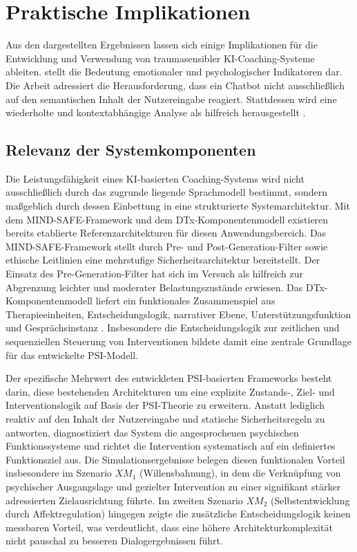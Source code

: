 \section{Praktische Implikationen}
Aus den dargestellten Ergebnissen lassen sich einige Implikationen für die Entwicklung und Verwendung von traumasensibler KI-Coaching-Systeme ableiten. \cite{Kuhl2000The} stellt die Bedeutung emotionaler und psychologischer Indikatoren dar. Die Arbeit adressiert die Herausforderung, dass ein Chatbot nicht ausschließlich auf den semantischen Inhalt der Nutzereingabe reagiert. Stattdessen wird eine wiederholte und kontextabhängige Analyse als hilfreich herausgestellt \citep{kuhl2014psi,mai2020ai}. 

\subsection{Relevanz der Systemkomponenten}

Die Leistungsfähigkeit eines KI-basierten Coaching-Systems wird nicht ausschließlich 
durch das zugrunde liegende Sprachmodell bestimmt, sondern maßgeblich durch dessen 
Einbettung in eine strukturierte Systemarchitektur. Mit dem MIND-SAFE-Framework 
\citep{boit2025prompt} und dem DTx-Komponentenmodell \citep{baumel2025more} existieren 
bereits etablierte Referenzarchitekturen für diesen Anwendungsbereich. Das 
MIND-SAFE-Framework stellt durch Pre- und Post-Generation-Filter sowie ethische Leitlinien eine 
mehrstufige Sicherheitsarchitektur bereitstellt. Der Einsatz des Pre-Generation-Filter hat sich im Versuch als hilfreich zur 
Abgrenzung leichter und moderater Belastungszustände erwiesen. Das 
DTx-Komponentenmodell liefert ein funktionales Zusammenspiel aus 
Therapieeinheiten, Entscheidungslogik, narrativer Ebene, Unterstützungsfunktion 
und Gesprächsinstanz \citep{baumel2025more}. Insbesondere die Entscheidungslogik zur 
zeitlichen und sequenziellen Steuerung von Interventionen bildete damit eine zentrale 
Grundlage für das entwickelte PSI-Modell.

Der spezifische Mehrwert des entwickleten PSI-basierten Frameworks besteht darin, diese bestehenden 
Architekturen um eine explizite Zustands-, Ziel- und Interventionslogik auf Basis der 
PSI-Theorie zu erweitern. Anstatt lediglich reaktiv auf den Inhalt der Nutzereingabe 
und statische Sicherheitsregeln zu antworten, diagnostiziert das System die 
angesprochenen psychischen Funktionssysteme und richtet die Intervention systematisch 
auf ein definiertes Funktionsziel aus. Die Simulationsergebnisse belegen diesen 
funktionalen Vorteil insbesondere im Szenario $XM_1$ (Willensbahnung), in dem die Verknüpfung von psychischer Ausgangslage und gezielter Intervention zu einer 
signifikant stärker adressierten Zielausrichtung führte. Im zweiten Szenario $XM_2$ (Selbstentwicklung durch Affektregulation) hingegen 
zeigte die zusätzliche Entscheidungslogik keinen messbaren Vorteil, was verdeutlicht, 
dass eine höhere Architekturkomplexität nicht pauschal zu besseren Dialogergebnissen führt.

